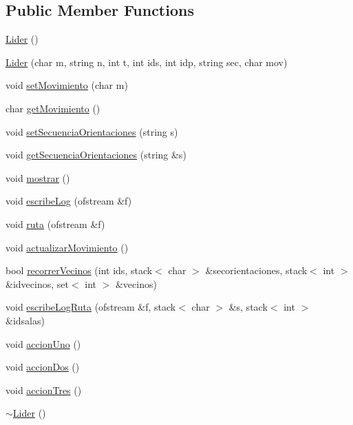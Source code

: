 \subsection*{Public Member Functions}
\begin{CompactItemize}
\item 
\hyperlink{classLider_bbdd9719261866f4f316620b4319d7e6}{Lider} ()
\item 
\hyperlink{classLider_16da42712d18eb29d78b81613f3d916d}{Lider} (char m, string n, int t, int ids, int idp, string sec, char mov)
\item 
void \hyperlink{classLider_8b7b93efc0b6cecbab4ae82992ebcd11}{setMovimiento} (char m)
\item 
char \hyperlink{classLider_2fb77f30c5ebb7bce39dc7ee4711d4d2}{getMovimiento} ()
\item 
void \hyperlink{classLider_84acf3920a695ab792f9bbcb494ea7c8}{setSecuenciaOrientaciones} (string s)
\item 
void \hyperlink{classLider_38d5268d1d780494277063ce96c52881}{getSecuenciaOrientaciones} (string \&s)
\item 
void \hyperlink{classLider_125acbb3a1432f217efdc9826a2b8d8f}{mostrar} ()
\item 
void \hyperlink{classLider_fcd179370f87dbc08bf6619ff9742f66}{escribeLog} (ofstream \&f)
\item 
void \hyperlink{classLider_6b98929df0d59cd29b85e6fb8aeb36f1}{ruta} (ofstream \&f)
\item 
void \hyperlink{classLider_87a0b4fca538efa5c9b7d01992f362e6}{actualizarMovimiento} ()
\item 
bool \hyperlink{classLider_9b40d8d989e80fbfd39a17bac209b73e}{recorrerVecinos} (int ids, stack$<$ char $>$ \&secorientaciones, stack$<$ int $>$ \&idvecinos, set$<$ int $>$ \&vecinos)
\item 
void \hyperlink{classLider_4643215eb946b9bd002d6882c5a24aeb}{escribeLogRuta} (ofstream \&f, stack$<$ char $>$ \&s, stack$<$ int $>$ \&idsalas)
\item 
void \hyperlink{classLider_2729cb612e6ca2d2750f48b85743107e}{accionUno} ()
\item 
void \hyperlink{classLider_51fb2d9c6dfe283a13d61b8f546068f3}{accionDos} ()
\item 
void \hyperlink{classLider_993a29f5a5615bd8a41dfe550dfccb61}{accionTres} ()
\item 
\hyperlink{classLider_64481cdebf71c9b28ec7aef689fed43e}{$\sim$Lider} ()
\end{CompactItemize}


